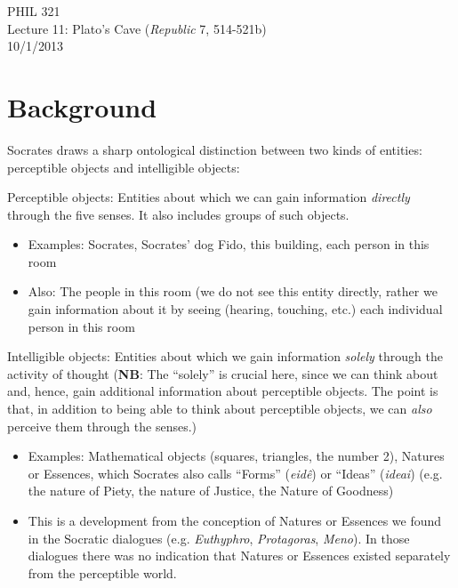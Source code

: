 \documentclass[11pt]{article}
\begin{document}
\thispagestyle{empty}
\begin{center} \LARGE{PHIL 321\\ Lecture 11: Plato's Cave (\emph{Republic} 7, 514-521b)}\\ \vspace*{2mm}
\large{10/1/2013}\end{center}
\thispagestyle{empty}\vspace*{3mm}
\vspace*{-8mm}

\section*{Background}

\noindent Socrates draws a sharp ontological distinction between two kinds of entities: perceptible objects and intelligible objects:
\vspace*{2mm}

\noindent Perceptible objects: Entities about which we can gain information \emph{directly} through the five senses. It also includes groups of such objects.
\begin{itemize}\item{Examples: Socrates, Socrates' dog Fido, this building, each person in this room}\item{Also: The people in this room (we do not see this entity directly, rather we gain information about it by seeing (hearing, touching, etc.) each individual person in this room}\end{itemize}

\noindent Intelligible objects: Entities about which we gain information \emph{solely} through the activity of thought (\textbf{NB}: The ``solely'' is crucial here, since we can think about and, hence, gain additional information about perceptible objects. The point is that, in addition to being able to think about perceptible objects, we can \emph{also} perceive them through the senses.)

\begin{itemize}\item{Examples: Mathematical objects (squares, triangles, the number 2), Natures or Essences, which Socrates also calls ``Forms'' (\emph{eid\^{e}}) or ``Ideas'' (\emph{ideai}) (e.g. the nature of Piety, the nature of Justice, the Nature of Goodness)}\item{This is a development from the conception of Natures or Essences we found in the Socratic dialogues (e.g. \emph{Euthyphro}, \emph{Protagoras}, \emph{Meno}). In those dialogues there was no indication that Natures or Essences existed separately from the perceptible world.}\end{itemize}
\end{document}
